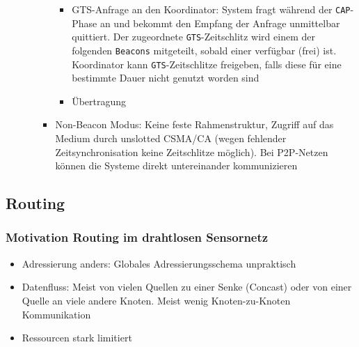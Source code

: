 \begin{itemize}
\begin{itemize}
\begin{itemize}
\begin{itemize}
				\item GTS-Anfrage an den Koordinator: System fragt während der \texttt{CAP}-Phase an und bekommt den Empfang der Anfrage unmittelbar quittiert. Der zugeordnete \texttt{GTS}-Zeitschlitz wird einem der folgenden \texttt{Beacons} mitgeteilt, sobald einer verfügbar (frei) ist. Koordinator kann \texttt{GTS}-Zeitschlitze freigeben, falls diese für eine bestimmte Dauer nicht genutzt worden sind
				\item Übertragung
			\end{itemize}
			\item Non-Beacon Modus: Keine feste Rahmenstruktur, Zugriff auf das Medium durch unslotted CSMA/CA (wegen fehlender Zeitsynchronisation keine Zeitschlitze möglich). Bei P2P-Netzen können die Systeme direkt untereinander kommunizieren
		\end{itemize}
	\end{itemize}
\end{itemize}


\subsection{Routing}

\subsubsection{Motivation Routing im drahtlosen Sensornetz}
\begin{itemize}
	\item Adressierung anders: Globales Adressierungsschema unpraktisch
	\item Datenfluss: Meist von vielen Quellen zu einer Senke (Concast) oder von einer Quelle an viele andere Knoten. Meist wenig Knoten-zu-Knoten Kommunikation
	\item Ressourcen stark limitiert
\end{itemize}

